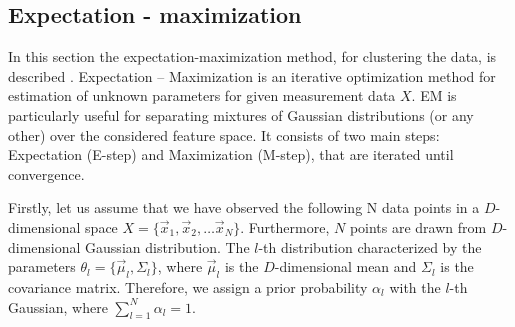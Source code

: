 \documentclass[11pt]{article}
\begin{document}
\subsection{Expectation - maximization}
In this section the expectation-maximization  method, for clustering the data, is described \cite{sundberg1974maximum,dempster1977maximum}. 
Expectation – Maximization  is an iterative optimization method for estimation of unknown parameters for given measurement data $X$. EM is particularly useful for separating mixtures of Gaussian distributions (or any other) over the considered feature space. It consists of two main steps: Expectation (E-step) and Maximization (M-step), that are iterated until convergence. 

Firstly, let us assume  that we have observed the following N data points in a $D$-dimensional space \newline
$X=\{\overrightarrow{x}_1,\overrightarrow{x}_2,\dots \overrightarrow{x}_N\}$. Furthermore, $N$ points are drawn from $D$-dimensional Gaussian distribution. The $l$-th distribution characterized by the parameters $\theta_l=\{\overrightarrow{\mu}_l,\Sigma_l\}$, where $\overrightarrow{\mu}_l$ is the $D$-dimensional mean and $\Sigma_l$ is the covariance matrix. Therefore, we  assign a prior probability $\alpha_l$ with the $l$-th Gaussian, where $\sum_{l=1}^N \alpha_l=1$.
\end{document}
